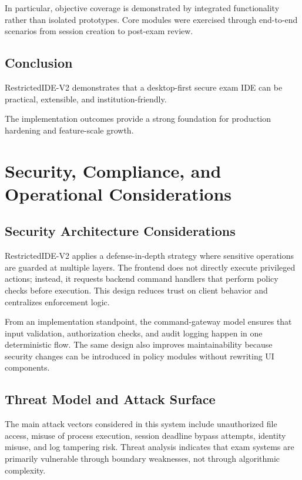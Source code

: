 \documentclass[12pt,a4paper]{report}
\begin{document}
	In particular, objective coverage is demonstrated by integrated functionality rather than isolated prototypes. Core modules were exercised through end-to-end scenarios from session creation to post-exam review.
	
	\section{Conclusion}
	RestrictedIDE-V2 demonstrates that a desktop-first secure exam IDE can be practical, extensible, and institution-friendly.
	
	The implementation outcomes provide a strong foundation for production hardening and feature-scale growth.
	
	\chapter{Security, Compliance, and Operational Considerations}
	
	\section{Security Architecture Considerations}
	RestrictedIDE-V2 applies a defense-in-depth strategy where sensitive operations are guarded at multiple layers. The frontend does not directly execute privileged actions; instead, it requests backend command handlers that perform policy checks before execution. This design reduces trust on client behavior and centralizes enforcement logic.
	
	From an implementation standpoint, the command-gateway model ensures that input validation, authorization checks, and audit logging happen in one deterministic flow. The same design also improves maintainability because security changes can be introduced in policy modules without rewriting UI components.
	
	\section{Threat Model and Attack Surface}
	The main attack vectors considered in this system include unauthorized file access, misuse of process execution, session deadline bypass attempts, identity misuse, and log tampering risk. Threat analysis indicates that exam systems are primarily vulnerable through boundary weaknesses, not through algorithmic complexity.
	
\end{document}
